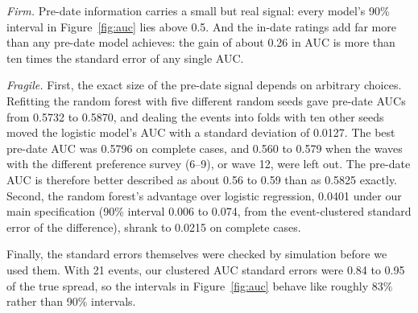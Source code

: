 \emph{Firm.} Pre-date information carries a small but real signal: every model's 90\% interval in
Figure~\ref{fig:auc} lies above 0.5. And the in-date ratings add far more than any pre-date model achieves: the gain
of about 0.26 in AUC is more than ten times the standard error of any single AUC.

\emph{Fragile.} First, the exact size of the pre-date signal depends on arbitrary choices. Refitting the random
forest with five different random seeds gave pre-date AUCs from 0.5732 to 0.5870, and dealing the events into folds
with ten other seeds moved the logistic model's AUC with a standard deviation of 0.0127. The best pre-date AUC was
0.5796 on complete cases, and 0.560 to 0.579 when the waves with the different preference survey (6--9), or wave 12,
were left out. The pre-date AUC is therefore better described as about 0.56 to 0.59 than as 0.5825 exactly. Second,
the random forest's advantage over logistic regression, 0.0401 under our main specification (90\% interval 0.006 to
0.074, from the event-clustered standard error of the difference), shrank to 0.0215 on complete cases.

Finally, the standard errors themselves were checked by simulation before we used them. With 21 events, our
clustered AUC standard errors were 0.84 to 0.95 of the true spread, so the intervals in Figure~\ref{fig:auc} behave
like roughly 83\% rather than 90\% intervals.
